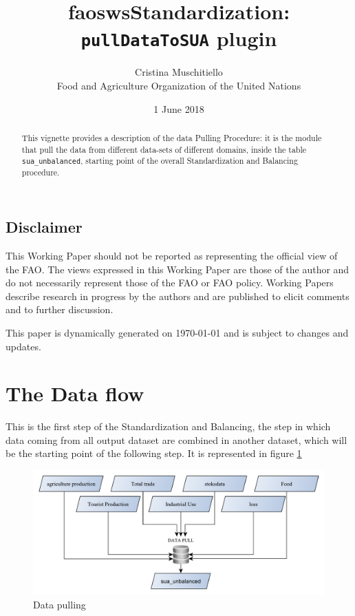 \documentclass[]{article}
\title{faoswsStandardization:\\
\texttt{pullDataToSUA} plugin}
\author{Cristina Muschitiello\\
Food and Agriculture Organization of the United Nations}
\date{1 June 2018}
\begin{document}
\maketitle
\begin{abstract}
This vignette provides a description of the data Pulling Procedure: it
is the module that pull the data from different data-sets of different
domains, inside the table \texttt{sua\_unbalanced}, starting point of
the overall Standardization and Balancing procedure.
\end{abstract}

{
\setcounter{tocdepth}{4}
\tableofcontents
}
\newpage

\listoffigures

\subsection*{Disclaimer}\label{disclaimer}

This Working Paper should not be reported as representing the official
view of the FAO. The views expressed in this Working Paper are those of
the author and do not necessarily represent those of the FAO or FAO
policy. Working Papers describe research in progress by the authors and
are published to elicit comments and to further discussion.

This paper is dynamically generated on \today{} and is subject to
changes and updates.

\newpage

\section*{The Data flow}\label{the-data-flow}

This is the first step of the Standardization and Balancing, the step in
which data coming from all output dataset are combined in another
dataset, which will be the starting point of the following step. It is
represented in figure \ref{fig:f1}

\begin{figure}[H]

{\centering \includegraphics[width=1\linewidth]{images/pullData/01_pulldata} 

}

\caption{\label{fig:f1}Data pulling}\label{fig:f1}
\end{figure}
\end{document}
